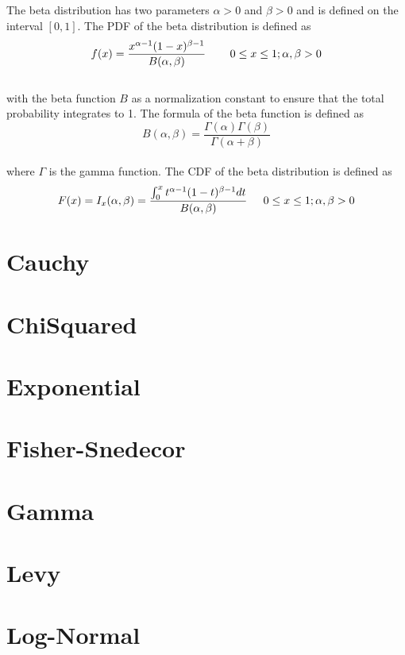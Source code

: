 		The beta distribution has two parameters $\alpha > 0$ and $\beta > 0$ and is defined on the interval $[0,1]$. The \ac{PDF} of the beta distribution is defined as
		\\
		$$f(x) = \frac{x^{\alpha-1}(1-x)^{\beta-1}}{B(\alpha,\beta)}  \hspace{.3in} 0 \le x \le 1; \alpha, \beta > 0$$
		\\
		with the beta function $B$ as a normalization constant to ensure that the total probability integrates to 1. The formula of the beta function is defined as
		\\
		$$B(\alpha,\beta) = \frac{\Gamma(\alpha)\Gamma(\beta)}{\Gamma(\alpha + \beta)}$$
		\\
		where $\Gamma$ is the gamma function. The \ac{CDF} of the beta distribution is defined as
		\\
		$$F(x) = I_{x}(\alpha,\beta) = \frac{\int_{0}^{x}{t^{\alpha-1}(1-t)^{\beta-1}dt}}{B(\alpha,\beta)} \hspace{.2in} 0 \le x \le 1; \alpha, \beta > 0$$

	\section{Cauchy}

	\section{ChiSquared}

	\section{Exponential}

	\section{Fisher-Snedecor}

	\section{Gamma}

	\section{Levy}

	\section{Log-Normal}

